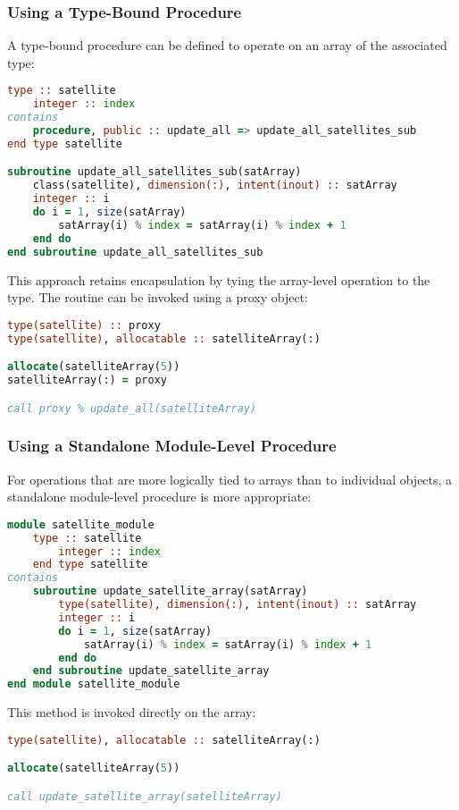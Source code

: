 \subsubsection{Using a Type-Bound Procedure}

A type-bound procedure can be defined to operate on an array of the associated type:
\begin{lstlisting}[language=Fortran]
type :: satellite
    integer :: index
contains
    procedure, public :: update_all => update_all_satellites_sub
end type satellite

subroutine update_all_satellites_sub(satArray)
    class(satellite), dimension(:), intent(inout) :: satArray
    integer :: i
    do i = 1, size(satArray)
        satArray(i) % index = satArray(i) % index + 1
    end do
end subroutine update_all_satellites_sub
\end{lstlisting}

This approach retains encapsulation by tying the array-level operation to the type. The routine can be invoked using a proxy object:
\begin{lstlisting}[language=Fortran]
type(satellite) :: proxy
type(satellite), allocatable :: satelliteArray(:)

allocate(satelliteArray(5))
satelliteArray(:) = proxy

call proxy % update_all(satelliteArray)
\end{lstlisting}

\subsubsection{Using a Standalone Module-Level Procedure}

For operations that are more logically tied to arrays than to individual objects, a standalone module-level procedure is more appropriate:
\begin{lstlisting}[language=Fortran]
module satellite_module
    type :: satellite
        integer :: index
    end type satellite
contains
    subroutine update_satellite_array(satArray)
        type(satellite), dimension(:), intent(inout) :: satArray
        integer :: i
        do i = 1, size(satArray)
            satArray(i) % index = satArray(i) % index + 1
        end do
    end subroutine update_satellite_array
end module satellite_module
\end{lstlisting}

This method is invoked directly on the array:
\begin{lstlisting}[language=Fortran]
type(satellite), allocatable :: satelliteArray(:)

allocate(satelliteArray(5))

call update_satellite_array(satelliteArray)
\end{lstlisting}

